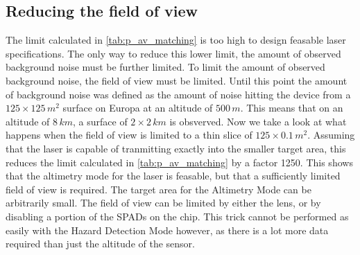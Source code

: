\subsection{Reducing the field of view}
The limit calculated in \cref{tab:p_av_matching} is too high to design feasable laser specifications. The only way to reduce this lower limit, the amount of observed background noise must be further limited. To limit the amount of observed background noise, the field of view must be limited. Until this point the amount of background noise was defined as the amount of noise hitting the device from a $125\times125\,m^2$ surface on Europa at an altitude of $500\,m$. This means that on an altitude of $8\,km$, a surface of $2\times2\,km$ is obsverved. Now we take a look at what happens when the field of view is limited to a thin slice of $125\times0.1\,m^2$. Assuming that the laser is capable of tranmitting exactly into the smaller target area, this reduces the limit calculated in \cref{tab:p_av_matching} by a factor 1250. This shows that the altimetry mode for the laser is feasable, but that a sufficiently limited field of view is required. The target area for the Altimetry Mode can be arbitrarily small. The field of view can be limited by either the lens, or by disabling a portion of the SPADs on the chip. This trick cannot be performed as easily with the Hazard Detection Mode however, as there is a lot more data required than just the altitude of the sensor. 
